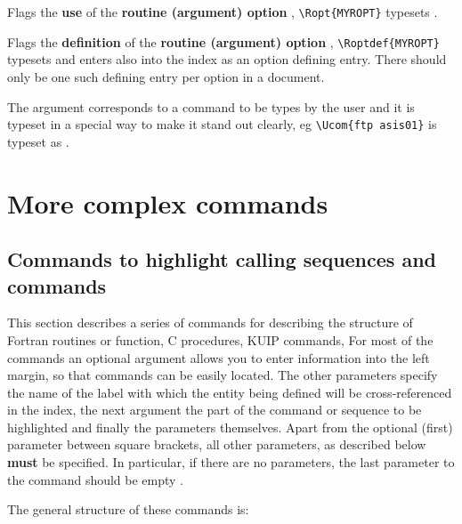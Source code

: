 
Flags the \textbf{use} of the \textbf{routine (argument) option} ,
\eg \verb!\Ropt{MYROPT}! typesets .


Flags the \textbf{definition} of the \textbf{routine (argument) option} 
,
\eg \verb!\Roptdef{MYROPT}! typesets  and enters 
also into the index as an option defining entry. 
There should only be one such defining entry per option in a document.


The argument  corresponds to a command to be
types by the user and it is typeset in a special way to make
it stand out clearly, eg \verb!\Ucom{ftp asis01}! is typeset
as .

\chapter{More complex commands}

\section{Commands to highlight calling sequences and commands}

This section describes a series of commands for describing
the structure of Fortran routines or function,
C procedures, KUIP commands, \etc
For most of the commands an optional argument allows you 
to enter information
into the left margin, so that commands can be easily located.
The other parameters specify the name of the label with which 
the entity being defined will be cross-referenced in the index,
the next argument the part of the command or sequence to be
highlighted and finally the parameters themselves.
Apart from the optional (first) parameter between square 
brackets, all other parameters, as described below \textbf{must}
be specified. 
In particular, if there are no parameters, the last
parameter to the command should be empty \Lit{\lcb\rcb}.

The general structure of these commands is:


